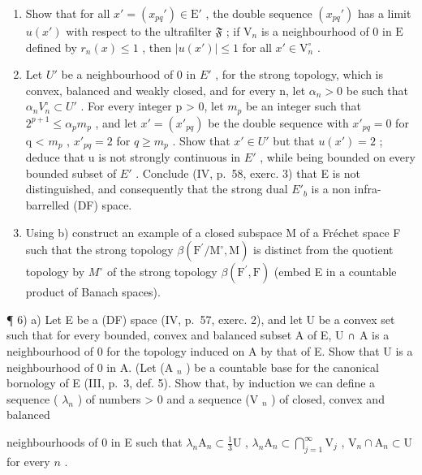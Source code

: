 \begin{enumerate}
\def\labelenumi{\alph{enumi})}
\item
  Show that for all \(x' = (x_{pq}') \in \mathrm{E}'\) , the double sequence \((x_{pq}')\) has a limit \(u(x')\) with respect to the ultrafilter \(\mathfrak{F}\) ; if \(\mathrm{V}_n\) is a neighbourhood of 0 in \(\mathrm{E}\) defined by \(r_n(x) \leqslant 1\) , then \(|u(x')| \leqslant 1\) for all \(x' \in \mathrm{V}_n^\circ\) .
\item
  Let \(U'\) be a neighbourhood of 0 in \(E'\) , for the strong topology, which is convex, balanced and weakly closed, and for every n, let \(\alpha_{n} > 0\) be such that \(\alpha_{n} V_{n}^{\circ} \subset U'\) . For every integer p \textgreater{} 0, let \(m_{p}\) be an integer such that \(2^{p+1} \leqslant \alpha_{p} m_{p}\) , and let \(x' = (x'_{pq})\) be the double sequence with \(x'_{pq} = 0\) for q \textless{} \(m_{p}\) , \(x'_{pq} = 2\) for \(q \geqslant m_{p}\) . Show that \(x' \in U'\) but that \(u(x') = 2\) ; deduce that u is not strongly continuous in \(E'\) , while being bounded on every bounded subset of \(E'\) . Conclude (IV, p.~58, exerc. 3) that E is not distinguished, and consequently that the strong dual \(E'_{b}\) is a non infra-barrelled (DF) space.
\item
  Using b) construct an example of a closed subspace M of a Fréchet space F such that the strong topology \(\beta(\mathrm{F}^{\prime}/\mathrm{M}^{\circ}, \mathrm{M})\) is distinct from the quotient topology by \(M^{\circ}\) of the strong topology \(\beta(\mathrm{F}^{\prime}, \mathrm{F})\) (embed E in a countable product of Banach spaces).
\end{enumerate}

¶ 6) a) Let E be a (DF) space (IV, p.~57, exerc. 2), and let U be a convex set such that for every bounded, convex and balanced subset A of E, U ∩ A is a neighbourhood of 0 for the topology induced on A by that of E. Show that U is a neighbourhood of 0 in A. (Let (A \(_{n}\) ) be a countable base for the canonical bornology of E (III, p.~3, def. 5). Show that, by induction we can define a sequence ( \(\lambda_{n}\) ) of numbers \textgreater{} 0 and a sequence (V \(_{n}\) ) of closed, convex and balanced

neighbourhoods of 0 in E such that \(\lambda_{n}\mathrm{A}_{n} \subset \frac{1}{3}\mathrm{U}\) , \(\lambda_{n}\mathrm{A}_{n} \subset \bigcap_{j=1}^{\infty} \mathrm{V}_{j}\) , \(\mathrm{V}_{n} \cap \mathrm{A}_{n} \subset \mathrm{U}\) for every \(n\) .

